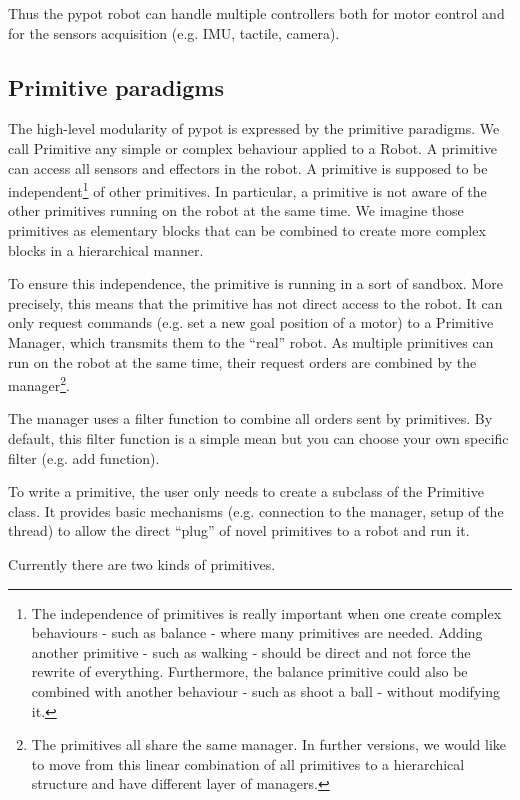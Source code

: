 Thus the pypot robot can handle multiple controllers both for motor control and for the sensors acquisition (e.g. IMU, tactile, camera).


\subsection{Primitive paradigms} %

The high-level modularity of pypot is expressed by the primitive paradigms. We call Primitive any simple or complex behaviour applied to a Robot. A primitive can access all sensors and effectors in the robot. A primitive is supposed to be independent\footnote{The independence of primitives is really important when one create complex behaviours - such as balance - where many primitives are needed. Adding another primitive - such as walking - should be direct and not force the rewrite of everything. Furthermore, the balance primitive could also be combined with another behaviour - such as shoot a ball - without modifying it.} of other primitives. In particular, a primitive is not aware of the other primitives running on the robot at the same time. We imagine those primitives as elementary blocks that can be combined to create more complex blocks in a hierarchical manner.

To ensure this independence, the primitive is running in a sort of sandbox. More precisely, this means that the primitive has not direct access to the robot. It can only request commands (e.g. set a new goal position of a motor) to a Primitive Manager, which transmits them to the “real” robot. As multiple primitives can run on the robot at the same time, their request orders are combined by the manager\footnote{The primitives all share the same manager. In further versions, we would like to move from this linear combination of all primitives to a hierarchical structure and have different layer of managers.}.

The manager uses a filter function to combine all orders sent by primitives. By default, this filter function is a simple mean but you can choose your own specific filter (e.g. add function).

To write a primitive, the user only needs to create a subclass of the Primitive class. It provides basic mechanisms (e.g. connection to the manager, setup of the thread) to allow the direct “plug” of novel primitives to a robot and run it.

Currently there are two kinds of primitives.


